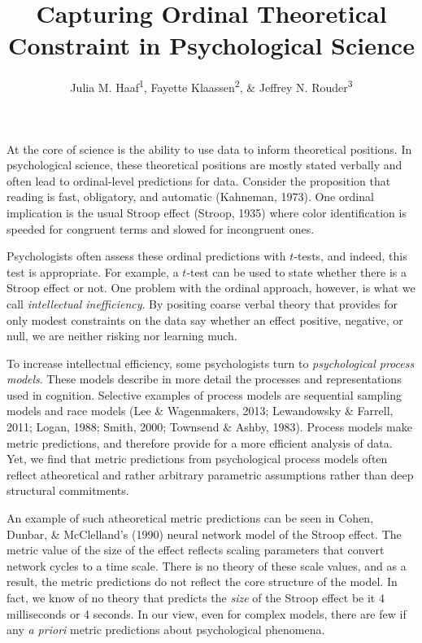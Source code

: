 \documentclass[english,,man]{apa6}
\title{Capturing Ordinal Theoretical Constraint in Psychological Science}
\author{Julia M. Haaf\textsuperscript{1}, Fayette Klaassen\textsuperscript{2}, \& Jeffrey N. Rouder\textsuperscript{3}}
\date{}
\affiliation{
\vspace{0.5cm}
\textsuperscript{1} University of Amsterdam\\\textsuperscript{2} Utrecht University\\\textsuperscript{3} University of California, Irvine}
\begin{document}
\maketitle

At the core of science is the ability to use data to inform theoretical positions. In psychological science, these theoretical positions are mostly stated verbally and often lead to ordinal-level predictions for data. Consider the proposition that reading is fast, obligatory, and automatic (Kahneman, 1973). One ordinal implication is the usual Stroop effect (Stroop, 1935) where color identification is speeded for congruent terms and slowed for incongruent ones.

Psychologists often assess these ordinal predictions with \(t\)-tests, and indeed, this test is appropriate.
For example, a \(t\)-test can be used to state whether there is a Stroop effect or not. One problem with the ordinal approach, however, is what we call \emph{intellectual inefficiency}. By positing coarse verbal theory that provides for only modest constraints on the data say whether an effect positive, negative, or null, we are neither risking nor learning much.

To increase intellectual efficiency, some psychologists turn to \emph{psychological process models}. These models describe in more detail the processes and representations used in cognition. Selective examples of process models are sequential sampling models and race models (Lee \& Wagenmakers, 2013; Lewandowsky \& Farrell, 2011; Logan, 1988; Smith, 2000; Townsend \& Ashby, 1983).
Process models make metric predictions, and therefore provide for a more efficient analysis of data. Yet, we find that metric predictions from psychological process models often reflect atheoretical and rather arbitrary parametric assumptions rather than deep structural commitments.

An example of such atheoretical metric predictions can be seen in Cohen, Dunbar, \& McClelland's (1990) neural network model of the Stroop effect.
The metric value of the size of the effect reflects scaling parameters that convert network cycles to a time scale.
There is no theory of these scale values, and as a result, the metric predictions do not reflect the core structure of the model.
In fact, we know of no theory that predicts the \emph{size} of the Stroop effect be it 4 milliseconds or 4 seconds.
In our view, even for complex models, there are few if any \emph{a priori} metric predictions about psychological phenomena.
\end{document}
